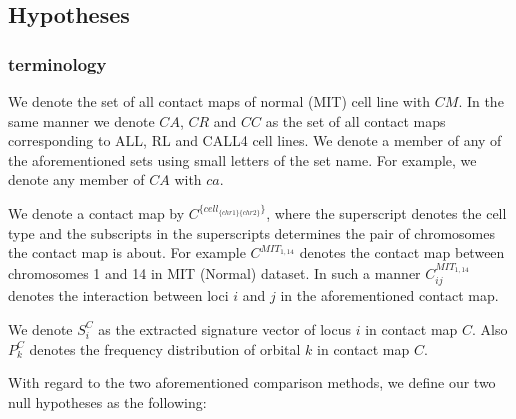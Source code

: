 \documentclass[a4,center,fleqn]{NAR}
\begin{document}
\subsection{Hypotheses}
\subsubsection{terminology}
We denote the set of all contact maps of normal (MIT) cell line with
$CM$. In the same manner we denote $CA$, $CR$ and $CC$ as the set of all
contact maps corresponding to ALL, RL and CALL4 cell lines.
We denote a member of any of the aforementioned sets using small
letters of the set name. For example, we denote any member of $CA$ with
$ca$.

We denote a contact map by $C^{\{cell_{\{chr1\}\{chr2\}}\}}$, where the
superscript denotes the cell type and the subscripts in the superscripts
determines the pair of chromosomes the contact map is about. For 
example $C^{MIT_{1,14}}$ denotes the contact map between chromosomes
1 and 14 in MIT (Normal) dataset. In such a manner $C^{MIT_{1,14}}_{ij}$
denotes the interaction between loci $i$ and $j$ in the aforementioned
contact map.

We denote $S^C_i$ as the extracted 
signature vector of locus $i$ in contact map $C$. 
Also $P^C_k$ denotes
the frequency distribution of orbital $k$ in contact map $C$.

With regard to the two aforementioned comparison methods, we define
our two null hypotheses as the following:
\end{document}
